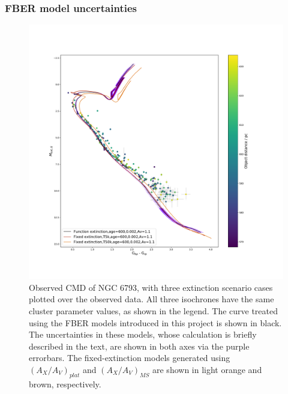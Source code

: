 \documentclass[12pt, a4paper]{report}
\begin{document}
\subsubsection{FBER model uncertainties}

\begin{figure}[h!]
\begin{center}
\includegraphics[width=1.0\textwidth]{../NGC_6793_CMD_Myr_model_err_vizier.pdf}
\caption{Observed CMD of NGC 6793, with three extinction scenario cases plotted over the observed data. All three isochrones have the same cluster parameter values, as shown in the legend. The curve treated using the FBER models introduced in this project is shown in black. The uncertainties in these models, whose calculation is briefly described in the text, are shown in both axes via the purple errorbars. The fixed-extinction models generated using $(A_{X}/A_{V})_{plat}$ and $(A_{X}/A_{V})_{MS}$ are shown in light orange and brown, respectively.}
\label{AxAv_model_err}
\end{center}
\end{figure}
\end{document}
